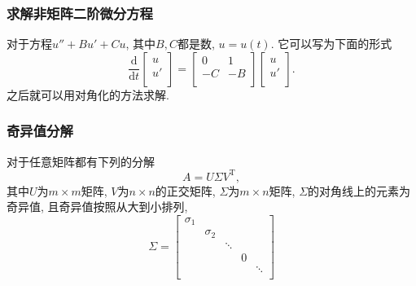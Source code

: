 \subsubsection{求解非矩阵二阶微分方程}
对于方程$u'' + B u' + C u$, 其中$B, C$都是数, $u= u\left( t \right) $.
它可以写为下面的形式
\begin{equation}
    \frac{\mathrm{d}}{\mathrm{d} t} \begin{bmatrix}
     u\\
     u'\\
    \end{bmatrix}
    =
    \begin{bmatrix}
     0 & 1\\
     -C & -B\\
    \end{bmatrix}
    \begin{bmatrix}
     u\\
     u'\\
    \end{bmatrix}.
\end{equation}
之后就可以用对角化的方法求解.

\subsubsection{奇异值分解}
对于任意矩阵都有下列的分解
\begin{equation}
    A = U \Sigma V^{\mathrm{T}} ,
\end{equation}
其中$U$为$m \times m$矩阵, $V$为$n \times n$的正交矩阵, $\Sigma$为$m \times n$矩阵, $\Sigma$的对角线上的元素为奇异值, 且奇异值按照从大到小排列, 
\begin{equation}
   \Sigma = 
   \begin{bmatrix}
    \sigma_1 &  &  &  & \\
     & \sigma_2 &  &  & \\
     &  & \ddots &  & \\
     &  &  & 0 & \\
     &  &  &  & \ddots\\
   \end{bmatrix}
\end{equation}



